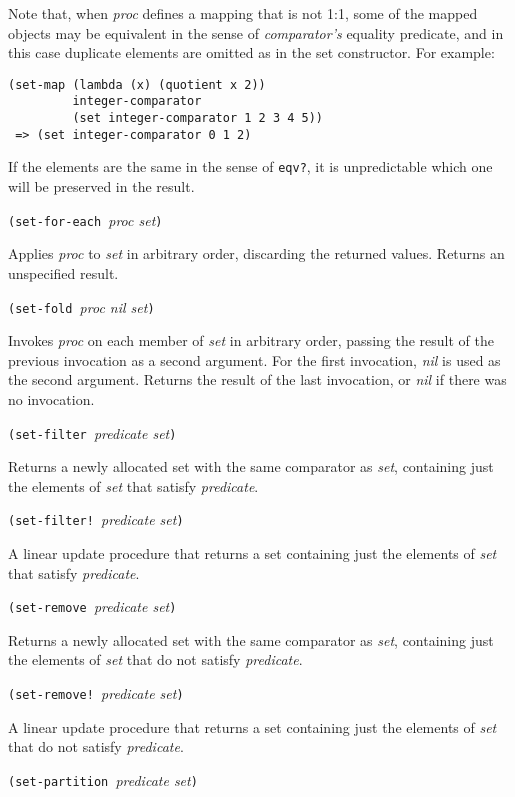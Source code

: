 Note that, when \emph{proc} defines a mapping that is not 1:1, some of
the mapped objects may be equivalent in the sense of \emph{comparator's}
equality predicate, and in this case duplicate elements are omitted as
in the set constructor. For example:

\begin{verbatim}
(set-map (lambda (x) (quotient x 2))
         integer-comparator
         (set integer-comparator 1 2 3 4 5))
 => (set integer-comparator 0 1 2)
\end{verbatim}

If the elements are the same in the sense of \texttt{eqv?}, it is
unpredictable which one will be preserved in the result.

\texttt{(set-for-each\ }\emph{proc set}\texttt{)}

Applies \emph{proc} to \emph{set} in arbitrary order, discarding the
returned values. Returns an unspecified result.

\texttt{(set-fold\ }\emph{proc nil set}\texttt{)}

Invokes \emph{proc} on each member of \emph{set} in arbitrary order,
passing the result of the previous invocation as a second argument. For
the first invocation, \emph{nil} is used as the second argument. Returns
the result of the last invocation, or \emph{nil} if there was no
invocation.

\texttt{(set-filter\ }\emph{predicate set}\texttt{)}

Returns a newly allocated set with the same comparator as \emph{set},
containing just the elements of \emph{set} that satisfy
\emph{predicate}.

\texttt{(set-filter!\ }\emph{predicate set}\texttt{)}

A linear update procedure that returns a set containing just the
elements of \emph{set} that satisfy \emph{predicate}.

\texttt{(set-remove\ }\emph{predicate set}\texttt{)}

Returns a newly allocated set with the same comparator as \emph{set},
containing just the elements of \emph{set} that do not satisfy
\emph{predicate}.

\texttt{(set-remove!\ }\emph{predicate set}\texttt{)}

A linear update procedure that returns a set containing just the
elements of \emph{set} that do not satisfy \emph{predicate}.

\texttt{(set-partition\ }\emph{predicate set}\texttt{)}

